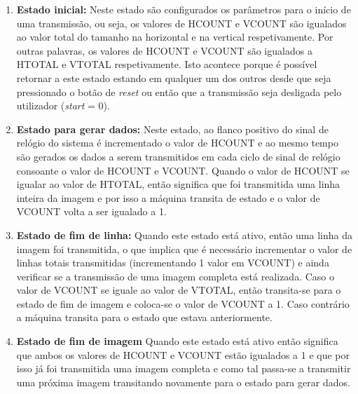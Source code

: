 \begin{enumerate}
	\item \textbf{Estado inicial:} Neste estado são configurados os parâmetros para o início de uma transmissão, ou seja, os valores de HCOUNT e VCOUNT são igualados ao valor total do tamanho na horizontal e na vertical respetivamente. Por outras palavras, os valores de HCOUNT e VCOUNT são igualados a HTOTAL e VTOTAL respetivamente. Isto acontece porque é possível retornar a este estado estando em qualquer um dos outros desde que seja pressionado o botão  de \textit{reset} ou então que a transmissão seja desligada pelo utilizador (\textit{start} = 0).
	\item \textbf{Estado para gerar dados:} Neste estado, ao flanco positivo do sinal de relógio do sistema é incrementado o valor de HCOUNT e ao mesmo tempo são gerados os dados a serem transmitidos em cada ciclo de sinal de relógio consoante o valor de HCOUNT e VCOUNT. Quando o valor de HCOUNT se igualar ao valor de HTOTAL, então significa que foi transmitida uma linha inteira da imagem e por isso a máquina transita de estado e o valor de VCOUNT volta a ser igualado a 1.
	\item \textbf{Estado de fim de linha:} Quando este estado está ativo, então uma linha da imagem foi transmitida, o que implica que é necessário incrementar o valor de linhas totais transmitidas (incrementando 1 valor em VCOUNT) e ainda verificar se a transmissão de uma imagem completa está realizada. Caso o valor de VCOUNT se iguale ao valor de VTOTAL, então transita-se para o estado de fim de imagem e coloca-se o valor de VCOUNT a 1. Caso contrário a máquina transita para o estado que estava anteriormente.
	\item \textbf{Estado de fim de imagem} Quando este estado está ativo então significa que ambos os valores de HCOUNT e VCOUNT estão igualados a 1 e que por isso já foi transmitida uma imagem completa e como tal passa-se a transmitir uma próxima imagem transitando novamente para o estado para gerar dados.
\end{enumerate}

